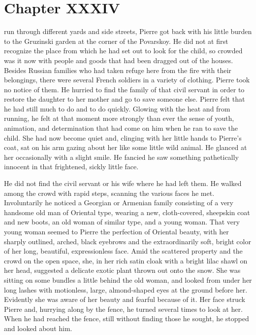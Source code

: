 \chapter*{Chapter XXXIV} \ifaudio {}
\fi

 run through different yards and side streets, Pierre got
back with his little burden to the Gruzinski garden at the corner
of the Povarskoy. He did not at first recognize the place from
which he had set out to look for the child, so crowded was it now
with people and goods that had been dragged out of the
houses. Besides Russian families who had taken refuge here from
the fire with their belongings, there were several French
soldiers in a variety of clothing. Pierre took no notice of
them. He hurried to find the family of that civil servant in
order to restore the daughter to her mother and go to save
someone else. Pierre felt that he had still much to do and to do
quickly. Glowing with the heat and from running, he felt at that
moment more strongly than ever the sense of youth, animation, and
determination that had come on him when he ran to save the
child. She had now become quiet and, clinging with her little
hands to Pierre's coat, sat on his arm gazing about her like some
little wild animal. He glanced at her occasionally with a slight
smile. He fancied he saw something pathetically innocent in that
frightened, sickly little face.

He did not find the civil servant or his wife where he had left
them. He walked among the crowd with rapid steps, scanning the
various faces he met. Involuntarily he noticed a Georgian or
Armenian family consisting of a very handsome old man of Oriental
type, wearing a new, cloth-covered, sheepskin coat and new boots,
an old woman of similar type, and a young woman. That very young
woman seemed to Pierre the perfection of Oriental beauty, with
her sharply outlined, arched, black eyebrows and the
extraordinarily soft, bright color of her long, beautiful,
expressionless face. Amid the scattered property and the crowd on
the open space, she, in her rich satin cloak with a bright lilac
shawl on her head, suggested a delicate exotic plant thrown out
onto the snow.  She was sitting on some bundles a little behind
the old woman, and looked from under her long lashes with
motionless, large, almond-shaped eyes at the ground before
her. Evidently she was aware of her beauty and fearful because of
it. Her face struck Pierre and, hurrying along by the fence, he
turned several times to look at her. When he had reached the
fence, still without finding those he sought, he stopped and
looked about him.

